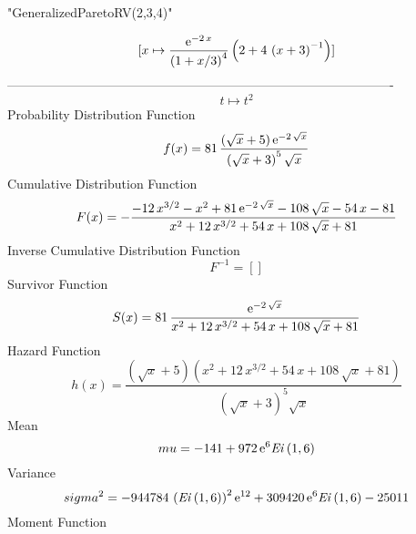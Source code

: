 \documentclass[12pt]{article}
\begin{document}
 
                        "GeneralizedParetoRV(2,3,4)"

$$[x\mapsto {\frac {{{\rm e}^{-2\,x}}}{ \left( 1+x/3 \right) ^{4}}
 \left( 2+4\, \left( x+3 \right) ^{-1} \right) }]
$$-------------------------------------------------------------------------------------------  \\$$t\mapsto {t}^{2}
$$Probability Distribution Function 
$$  f(x)=81\,{\frac { \left( \sqrt {x}+5 \right) {{\rm e}^{-2\,\sqrt {x}}}}{
 \left( \sqrt {x}+3 \right) ^{5}\sqrt {x}}}
$$Cumulative Distribution Function  
 $$F(x)=-{\frac {-12\,{x}^{3/2}-{x}^{2}+81\,{{\rm e}^{-2\,\sqrt {x}}}-108\,
\sqrt {x}-54\,x-81}{{x}^{2}+12\,{x}^{3/2}+54\,x+108\,\sqrt {x}+81}}
$$ Inverse Cumulative Distribution Function 
  $$F^{-1} = []
$$Survivor Function 
 $$ S(x)=81\,{\frac {{{\rm e}^{-2\,\sqrt {x}}}}{{x}^{2}+12\,{x}^{3/2}+54\,x+108
\,\sqrt {x}+81}}
$$ Hazard Function 
 $$ h(x)={\frac { \left( \sqrt {x}+5 \right)  \left( {x}^{2}+12\,{x}^{3/2}+54\,
x+108\,\sqrt {x}+81 \right) }{ \left( \sqrt {x}+3 \right) ^{5}\sqrt {x
}}}
$$Mean 
 $$ mu=-141+972\,{{\rm e}^{6}}{\it Ei} \left( 1,6 \right) 
$$ Variance 
 $$ sigma^2 = -944784\, \left( {\it Ei} \left( 1,6 \right)  \right) ^{2}{{\rm e}^{12
}}+309420\,{{\rm e}^{6}}{\it Ei} \left( 1,6 \right) -25011
$$Moment Function 
\end{document}
